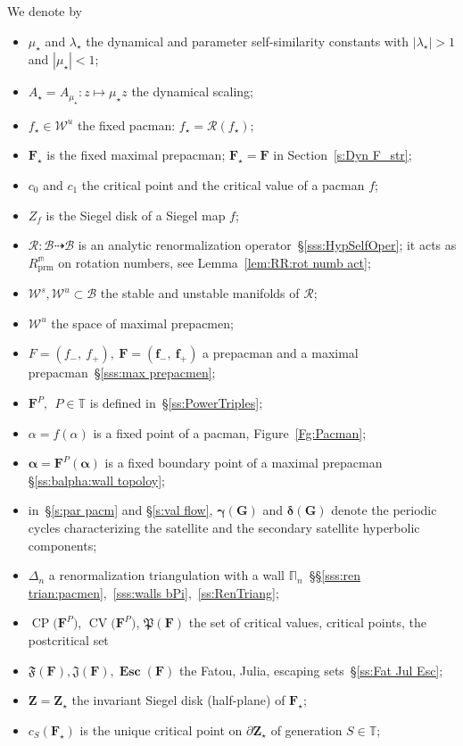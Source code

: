 \documentclass{amsart}
\renewcommand{\sp}{{\ \ }}
\newcommand{\1}{{\mathbb 1 }}
\newcommand\PT{\mathbb{ T}}
\newcommand{\bDelta}{{\mathbb{\Delta}}}
\newcommand{\bPi}{{\mathbb{\Pi}}}
\newcommand\RR{\mathcal{R}}
\newcommand\prm{{\operatorname{prm}}}
\newcommand\cRRc{R_{\prm}}%
\newcommand\Jul{{\mathfrak J}}
\newcommand\Post{{\mathfrak P}}
\newcommand{\bF}{{\mathbf F}}
\newcommand{\bZ}{{\mathbf Z}}
\newcommand{\bG}{{\mathbf G}}
\newcommand{\bbf}{{\mathbf f}}
\newcommand{\str}{{\star}}
\newcommand{\mm}{\mathbb{m}}
\newcommand\WW{\mathcal{W}}
\newcommand\Unst{{\boldsymbol{\mathcal{W}}^u}}
\newcommand\BB{\mathcal{B}}
\theoremstyle{remark}
\numberwithin{equation}{section}
\theoremstyle{definition}
\newcommand{\Fat}{{\mathfrak F}}
\newcommand{\Esc}{{\boldsymbol{\operatorname{Esc}}}}
\newcommand{\CV}{{\operatorname{CV}}}
\newcommand{\CP}{{\operatorname{CP}}}
\newcommand{\balpha}{{\boldsymbol \alpha}}
\newcommand{\bgamma}{{\boldsymbol{ \gamma}}}
\newcommand{\bdelta}{{\boldsymbol{ \delta}}}
\theoremstyle{nonumberbreak}
\begin{document}
We denote by 
\begin{itemize}

\item $\mu_\str$ and $\lambda_\str$ the dynamical and parameter self-similarity constants with $| \lambda_\str|>1$ and $|\mu_\str|<1$;
\item $A_\str=A_{\mu_\str}\colon z\mapsto \mu_\str z$ the dynamical scaling;
\item $f_\str\in \WW^u$ the fixed pacman: $f_\str=\RR(f_\str)$;
\item $\bF_\str$ is the fixed maximal prepacman; $\bF_\str=\bF$ in Section~\ref{s:Dyn F_str};
\item  $c_0$ and $c_1$ the critical point and the critical value of a pacman $f$;



\item $Z_f$ is the Siegel disk of a Siegel map $f$;



\item $\RR\colon \BB \dashrightarrow \BB$ is an analytic renormalization operator~\S\ref {sss:HypSelfOper}; it acts as $\cRRc^\mm$ on rotation numbers, see Lemma~\ref{lem:RR:rot numb act};
\item $\WW^s,\WW^u\subset \BB$ the stable and unstable manifolds of $\RR$; 
\item $\Unst$ the space of maximal prepacmen;

\item $F=(f_-,\ f_+),\  \bF=(\bbf_-,\ \bbf_+)$ a prepacman and a maximal prepacman~\S\ref{sss:max prepacmen};
\item  $\bF^P,\sp P\in \PT$ is defined in~\S\ref{ss:PowerTriples}; 
\item $\alpha=f(\alpha)$ is a fixed point of a pacman, Figure~\ref{Fg:Pacman};
\item $\balpha=\bF^P(\balpha)$ is a fixed boundary point of a maximal prepacman \S\ref{ss:balpha:wall topoloy};
\item in~\S\ref{s:par pacm} and \S\ref{s:val flow}, $\bgamma(\bG)$ and $\bdelta(\bG)$ denote the periodic cycles characterizing the satellite and the secondary satellite hyperbolic components;

\item $\bDelta_n$ a renormalization triangulation with a wall $\bPi_n$~\S\S\ref{sss:ren trian:pacmen},~\ref{sss:walls bPi},~\ref{ss:RenTriang};  
\item $\CP\big(\bF^P\big)$, $\CV\big(\bF^P\big)$, $\Post(\bF)$ the set of critical values, critical points, the postcritical set 
\item $\Fat(\bF), \Jul(\bF) , \Esc(\bF)$ the Fatou, Julia,  escaping sets~\S\ref{ss:Fat Jul  Esc};
\item $\bZ=\bZ_\str$ the invariant Siegel disk (half-plane) of $\bF_\str$;
\item $c_S(\bF_\str)$ is the unique critical point on $\partial \bZ_\str$ of generation $S\in \PT$;


\end{itemize}
\end{document}
